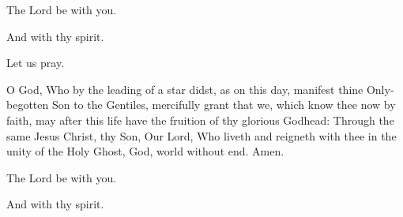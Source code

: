 


\rubric{\Vbar\ }The Lord be with you.

\rubric{\Rbar\ }And with thy spirit.

Let us pray.

O God, Who by the leading of a star didst, as on this day, manifest thine Only-begotten Son to the Gentiles, mercifully grant that we, which know thee now by faith, may after this life have the fruition of thy glorious Godhead: Through the same Jesus Christ, thy Son, Our Lord, Who liveth and reigneth with thee in the unity of the Holy Ghost, God, world without end. \rubric{\Rbar\ } Amen.

\rubric{\Vbar\ }The Lord be with you.

\rubric{\Rbar\ }And with thy spirit.